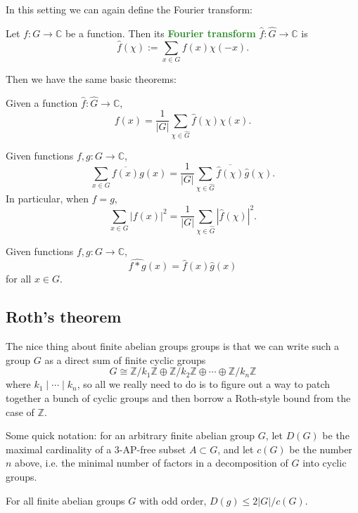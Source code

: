 \documentclass[10pt]{scrartcl}
\providecommand{\ol}{\overline}
\providecommand{\CC}{\mathbb C}
\providecommand{\ZZ}{\mathbb Z}
\renewcommand{\hat}{\widehat}
\providecommand{\vocab}[1]{{\textbf{\textcolor{ForestGreen}{#1}}}}
\begin{document}
In this setting we can again define the Fourier transform:
\begin{definition}
	Let $f\colon G\to\CC$ be a function. Then its \vocab{Fourier transform}
	$\hat f\colon\hat G\to\CC$ is
	\[\hat f(\chi) := \sum_{x\in G} f(x)\chi(-x).\]
\end{definition}

Then we have the same basic theorems:
\begin{theorem}
	Given a function $\hat f\colon\hat G\to\CC$,
	\[f(x) = \frac{1}{|G|}\sum_{\chi\in\hat G}\hat f(\chi)\chi(x).\]
\end{theorem}

\begin{theorem}
	Given functions $f,g\colon G\to\CC$,
	\[\sum_{x\in G}\ol{f(x)}g(x)
	= \frac1{|G|}\sum_{\chi\in\hat G}\ol{\hat f(\chi)}\hat g(\chi).\]
	In particular, when $f=g$,
	\[\sum_{x\in G}|f(x)|^2 =
	\frac{1}{|G|}\sum_{\chi\in\hat G}|\hat f(\chi)|^2.\]
\end{theorem}

\begin{theorem}
	Given functions $f,g\colon G\to\CC$,
	\[\hat{f*g}(x) = \hat f(x)\hat g(x)\]
	for all $x\in G$.
\end{theorem}

\pagebreak
\subsection{Roth's theorem}

The nice thing about finite abelian groups groups is that we can write
such a group $G$ as a direct sum of finite cyclic groups
\[G \cong \ZZ/k_1\ZZ \oplus \ZZ/k_2\ZZ\oplus\cdots\oplus \ZZ/k_n\ZZ\]
where $k_1\mid \cdots\mid k_n$, so all we really need to do
is to figure out a way to patch together a bunch of cyclic groups
and then borrow a Roth-style bound from the case of $\ZZ$.

Some quick notation:
for an arbitrary finite abelian group $G$,
let $D(G)$ be the maximal cardinality of a 3-AP-free subset $A\subset G$,
and let $c(G)$ be the number $n$ above, i.e. the minimal number
of factors in a decomposition of $G$ into cyclic groups.

\begin{theorem}
	For all finite abelian groups $G$ with odd order,
	$D(g)\le 2|G|/c(G)$.
\end{theorem}
\end{document}
